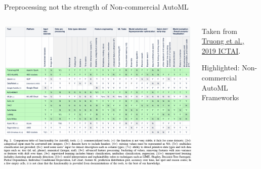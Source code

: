 \begin{frame}{Preprocessing not the strength of Non-commercial AutoML}
  \begin{columns}
    \begin{column}{0.6\textwidth}
      \vspace*{-1cm}
      \begin{center}
        \includegraphics[width = \linewidth]{images/Truong2019Towards_fig2.pdf}
      \end{center}
    \end{column}%
    \begin{column}{0.3\textwidth}
    \small
      Taken from \href{https://doi.org/10.1109/ICTAI.2019.00209}{Truong et al., 2019 ICTAI}.
      \vspace{1em}

      Highlighted: Non-commercial AutoML Frameworks
    \end{column}
  \end{columns}
\end{frame}

